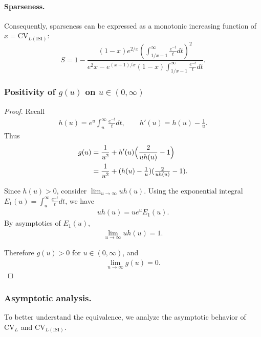 \documentclass[11pt]{article}
\theoremstyle{remark}
\theoremstyle{definition}
\begin{document}
\paragraph{Sparseness.}
Consequently, sparseness can be expressed as a monotonic increasing function of $x=\mathrm{CV}_{L(\mathrm{ISI})}$:
\begin{equation}
S = 1-\frac{(1-x)e^{2/x}\left( \int_{1/x-1}^{\infty} \frac{e^{-t}}{t} dt \right)^2}
{e^2x-e^{(x+1)/x}(1-x)\int_{1/x-1}^\infty \frac{e^{-t}}{t}dt}.
\end{equation}

\subsubsection{Positivity of $g(u)$ on $u\in(0,\infty)$}
\label{gupos}
\begin{proof}
Recall
\begin{align}
h(u)=e^u\int_{u}^{\infty}\frac{e^{-t}}{t} dt, 
\qquad h'(u)=h(u)-\tfrac{1}{u}.
\end{align}
Thus
\begin{align}
g(u) &= \frac{1}{u^2}+h'(u)\Big(\frac{2}{uh(u)}-1\Big) \notag \\
&= \frac{1}{u^2}+(h(u)-\tfrac{1}{u})(\tfrac{2}{uh(u)}-1).
\end{align}

Since $h(u)>0$, consider $\lim_{u\to\infty} uh(u)$.  
Using the exponential integral $E_1(u)=\int_u^\infty \tfrac{e^{-t}}{t}dt$, we have
\begin{align}
uh(u)=u e^u E_1(u).
\end{align}
By asymptotics of $E_1(u)$,
\begin{align}
\lim_{u\to\infty} u h(u) = 1.
\end{align}

Therefore $g(u)>0$ for $u\in(0,\infty)$, and
\begin{align}
\lim_{u\to\infty} g(u) = 0.
\end{align}
\end{proof}

\subsubsection{Asymptotic analysis.}

To better understand the equivalence, we analyze the asymptotic behavior of 
\(\mathrm{CV}_L\) and \(\mathrm{CV}_{L(\mathrm{ISI})}\).
\end{document}

